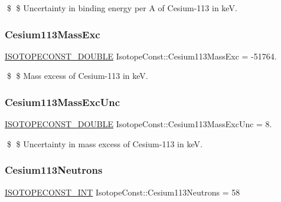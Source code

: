 \$ \$ Uncertainty in binding energy per A of Cesium-\/113 in keV. \mbox{\label{group___isotope_const-_cesium-_cs113_gaa4a7823cc447d69c842e3b991dfac809}} 
\subsubsection{\texorpdfstring{Cesium113\+Mass\+Exc}{Cesium113MassExc}}
{\footnotesize\ttfamily \mbox{\hyperlink{group___isotope_const-_macros_ga8f45a7272ce02c0b4c65c44636ed719a}{I\+S\+O\+T\+O\+P\+E\+C\+O\+N\+S\+T\+\_\+\+D\+O\+U\+B\+LE}} Isotope\+Const\+::\+Cesium113\+Mass\+Exc = -\/51764.}

\$ \$ Mass excess of Cesium-\/113 in keV. \mbox{\label{group___isotope_const-_cesium-_cs113_gaa56223b0f56caff9cb5eb56f69cef531}} 
\subsubsection{\texorpdfstring{Cesium113\+Mass\+Exc\+Unc}{Cesium113MassExcUnc}}
{\footnotesize\ttfamily \mbox{\hyperlink{group___isotope_const-_macros_ga8f45a7272ce02c0b4c65c44636ed719a}{I\+S\+O\+T\+O\+P\+E\+C\+O\+N\+S\+T\+\_\+\+D\+O\+U\+B\+LE}} Isotope\+Const\+::\+Cesium113\+Mass\+Exc\+Unc = 8.}

\$ \$ Uncertainty in mass excess of Cesium-\/113 in keV. \mbox{\label{group___isotope_const-_cesium-_cs113_ga849f84722624391eba85fca51ada52e9}} 
\subsubsection{\texorpdfstring{Cesium113\+Neutrons}{Cesium113Neutrons}}
{\footnotesize\ttfamily \mbox{\hyperlink{group___isotope_const-_macros_ga5f18360b3e99483a35c32d789e62621c}{I\+S\+O\+T\+O\+P\+E\+C\+O\+N\+S\+T\+\_\+\+I\+NT}} Isotope\+Const\+::\+Cesium113\+Neutrons = 58}

